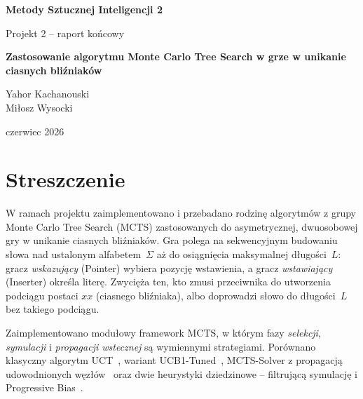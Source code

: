 \documentclass{article}
\begin{document}
\begin{titlepage}
    \centering
    {\fontsize{60}{30}\selectfont \textbf{Metody Sztucznej Inteligencji 2} \par}
    \vspace{1.5cm}
    {\fontsize{30}{20}\selectfont Projekt 2 -- raport końcowy \par}
    \vspace{5cm}
    {\fontsize{36}{20}\selectfont \textbf{Zastosowanie algorytmu Monte Carlo Tree Search w grze w unikanie ciasnych bliźniaków} \par}
    \vspace{7.5cm}

    {\fontsize{26}{20}\selectfont
    Yahor Kachanouski\\
    Miłosz Wysocki
    \par}
    \vspace{0.5cm}
    \vfill

    {\large czerwiec 2026 \par}
\end{titlepage}

\tableofcontents
\newpage

\section{Streszczenie}

W ramach projektu zaimplementowano i przebadano rodzinę algorytmów z grupy
Monte Carlo Tree Search (MCTS) zastosowanych do asymetrycznej, dwuosobowej gry
w unikanie ciasnych bliźniaków. Gra polega na sekwencyjnym budowaniu słowa
nad ustalonym alfabetem~$\Sigma$ aż do osiągnięcia maksymalnej długości~$L$:
gracz \emph{wskazujący} (Pointer) wybiera pozycję wstawienia, a gracz
\emph{wstawiający} (Inserter) określa literę. Zwycięża ten, kto zmusi
przeciwnika do utworzenia podciągu postaci $xx$ (ciasnego bliźniaka),
albo doprowadzi słowo do długości~$L$ bez takiego podciągu.

Zaimplementowano modułowy framework MCTS, w którym fazy
\emph{selekcji}, \emph{symulacji} i \emph{propagacji wstecznej} są wymiennymi
strategiami. Porównano klasyczny algorytm UCT~\cite{Kocsis2006}, wariant
UCB1-Tuned~\cite{Auer2002}, MCTS-Solver z propagacją udowodnionych
węzłów~\cite{Winands2008} oraz dwie heurystyki dziedzinowe -- filtrującą
symulację i Progressive Bias~\cite{Chaslot2008}.
\end{document}
